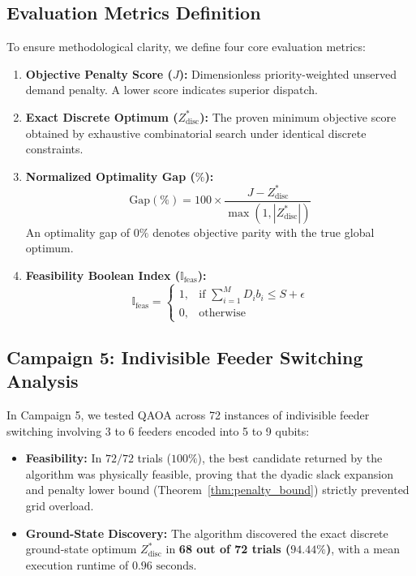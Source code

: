 \documentclass[11pt,a4paper]{article}
\theoremstyle{definition}
\theoremstyle{remark}
\begin{document}
\subsection{Evaluation Metrics Definition}
To ensure methodological clarity, we define four core evaluation metrics:
\begin{enumerate}
    \item \textbf{Objective Penalty Score ($J$):} Dimensionless priority-weighted unserved demand penalty. A lower score indicates superior dispatch.
    \item \textbf{Exact Discrete Optimum ($Z^*_{\text{disc}}$):} The proven minimum objective score obtained by exhaustive combinatorial search under identical discrete constraints.
    \item \textbf{Normalized Optimality Gap ($\%$):}
    \begin{equation}
    \text{Gap}(\%) = 100 \times \frac{J - Z^*_{\text{disc}}}{\max(1, |Z^*_{\text{disc}}|)}
    \end{equation}
    An optimality gap of $0\%$ denotes objective parity with the true global optimum.
    \item \textbf{Feasibility Boolean Index ($\mathbb{I}_{\text{feas}}$):}
    \begin{equation}
    \mathbb{I}_{\text{feas}} = \begin{cases} 1, & \text{if } \sum_{i=1}^M D_i b_i \le S + \epsilon \\ 0, & \text{otherwise} \end{cases}
    \end{equation}
\end{enumerate}

\subsection{Campaign 5: Indivisible Feeder Switching Analysis}
In Campaign 5, we tested QAOA across 72 instances of indivisible feeder switching involving 3 to 6 feeders encoded into 5 to 9 qubits:
\begin{itemize}
    \item \textbf{Feasibility:} In $72 / 72$ trials ($100\%$), the best candidate returned by the algorithm was physically feasible, proving that the dyadic slack expansion and penalty lower bound (Theorem~\ref{thm:penalty_bound}) strictly prevented grid overload.
    \item \textbf{Ground-State Discovery:} The algorithm discovered the exact discrete ground-state optimum $Z^*_{\text{disc}}$ in \textbf{68 out of 72 trials ($94.44\%$)}, with a mean execution runtime of $0.96\text{ seconds}$.
\end{itemize}
\end{document}

